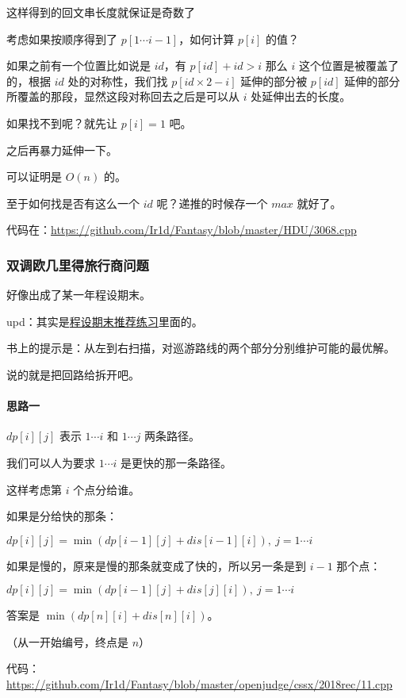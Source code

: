 这样得到的回文串长度就保证是奇数了

考虑如果按顺序得到了 $p[1 \cdots i - 1]$，如何计算 $p[i]$ 的值？

如果之前有一个位置比如说是 $id$，有 $p[id] + id > i$ 那么 $i$ 这个位置是被覆盖了的，根据 $id$ 处的对称性，我们找 $p[id \times 2 - i]$ 延伸的部分被 $p[id]$ 延伸的部分所覆盖的那段，显然这段对称回去之后是可以从 $i$ 处延伸出去的长度。

如果找不到呢？就先让 $p[i] = 1$ 吧。

之后再暴力延伸一下。

可以证明是 $O(n)$ 的。

至于如何找是否有这么一个 $id$ 呢？递推的时候存一个 $max$ 就好了。

代码在：\url{https://github.com/Ir1d/Fantasy/blob/master/HDU/3068.cpp}

\subsubsection{双调欧几里得旅行商问题}

好像出成了某一年程设期末。

upd：其实是\href{https://ir1d.cf/2018/06/23/cssx/程设期末推荐练习/}{程设期末推荐练习}里面的。

书上的提示是：从左到右扫描，对巡游路线的两个部分分别维护可能的最优解。

说的就是把回路给拆开吧。

\paragraph{思路一}

$dp[i][j]$ 表示 $1 \cdots i$ 和 $1 \cdots j$ 两条路径。

我们可以人为要求 $1 \cdots i$ 是更快的那一条路径。

这样考虑第 $i$ 个点分给谁。

如果是分给快的那条：

$dp[i][j] = \min(dp[i - 1][j] + dis[i - 1][i]),\ j = 1 \cdots i$

如果是慢的，原来是慢的那条就变成了快的，所以另一条是到 $i - 1$ 那个点：

$dp[i][j] = \min(dp[i - 1][j] + dis[j][i]),\ j = 1 \cdots i$

答案是 $\min(dp[n][i] + dis[n][i])$。

（从一开始编号，终点是 $n$）

代码：\url{https://github.com/Ir1d/Fantasy/blob/master/openjudge/cssx/2018rec/11.cpp}

